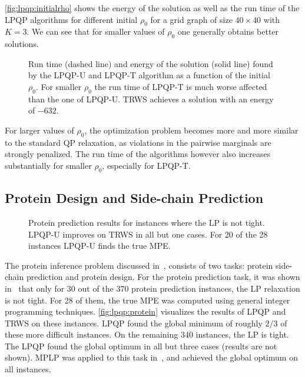 \autoref{fig:lpqp:initialrho} shows the energy of the solution as well as the
run time of the \ac{LPQP} algorithms for different initial $\rho_0$ for a grid
graph of size $40\times40$ with $K=3$. We can see that for
smaller values of $\rho_0$ one generally obtains better solutions.
\begin{figure}[htb]
    \centering
    
    \caption[Influence of $\rho_0$ in LPQP]{
    Run time (dashed line) and energy of the solution (solid line) found by
    the \acs{LPQP-U} and \acs{LPQP-T} algorithm as a function of the initial $\rho_0$.
    For smaller $\rho_0$ the run time of \acs{LPQP-T} is much worse affected than the one of
    \acs{LPQP-U}. \ac{TRWS} achieves a solution with an energy of $-632$.
    }
    \label{fig:lpqp:initialrho}
\end{figure}
For larger
values of $\rho_0$, the optimization problem becomes more and more similar to the standard
\ac{QP} relaxation, as violations in the pairwise marginals are strongly penalized.
The run time of the algorithms however also increases substantially for smaller $\rho_0$,
especially for \acs{LPQP-T}.

\subsection{Protein Design and Side-chain Prediction}

\begin{figure}[htb]
    \centering
    \def\outputfile{\dir/include/protein_result_lpnottight.csv}
    
    \caption[Protein prediction results of LPQP]{Protein prediction results for instances where the \ac{LP} is not
    tight. \acs{LPQP-U} improves on \ac{TRWS} in all but one cases. For 20
    of the 28 instances \acs{LPQP-U} finds the true \ac{MPE}.}
    \label{fig:lpqp:protein}
\end{figure}
The protein inference problem discussed in~\parencite{Yanover2006}, consists of two tasks:
protein side-chain prediction and protein design. 
For the protein prediction task, it was shown in~\parencite{Yanover2006}
that only for 30 out of the 370 protein prediction instances, the \ac{LP} relaxation is not tight. 
For 28 of them, the true \ac{MPE} was computed using general integer
programming techniques.
\autoref{fig:lpqp:protein} visualizes the results of \ac{LPQP} and \ac{TRWS} on these instances. 
\ac{LPQP} found the global minimum of roughly $2/3$ of these more difficult instances.
On the remaining 340 instances, the \ac{LP} is tight. The \ac{LPQP} found the global optimum in all but three cases 
(results are not shown).
\ac{MPLP} was applied to this task in~\parencite{Sontag2008}, and achieved the global optimum on all instances.

